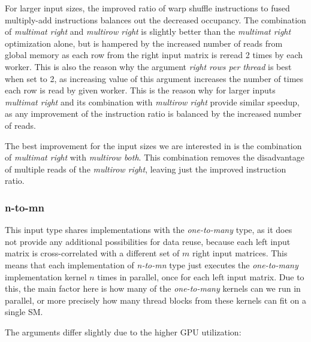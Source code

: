 For larger input sizes, the improved ratio of warp shuffle instructions to fused multiply-add instructions balances out the decreased occupancy. The combination of \textit{multimat right} and \textit{multirow right} is slightly better than the \textit{multimat right} optimization alone, but is hampered by the increased number of reads from global memory as each row from the right input matrix is reread 2 times by each worker. This is also the reason why the argument \textit{right rows per thread} is best when set to 2, as increasing value of this argument increases the number of times each row is read by given worker. This is the reason why for larger inputs \textit{multimat right} and its combination with \textit{multirow right} provide similar speedup, as any improvement of the instruction ratio is balanced by the increased number of reads.

The best improvement for the input sizes we are interested in is the combination of \textit{multimat right} with \textit{multirow both}. This combination removes the disadvantage of multiple reads of the \textit{multirow right}, leaving just the improved instruction ratio.


\subsubsection{n-to-mn}
This input type shares implementations with the \textit{one-to-many} type, as it does not provide any additional possibilities for data reuse, because each left input matrix is cross-correlated with a different set of $m$ right input matrices. This means that each implementation of \textit{n-to-mn} type just executes the \textit{one-to-many} implementation kernel $n$ times in parallel, once for each left input matrix. Due to this, the main factor here is how many of the \textit{one-to-many} kernels can we run in parallel, or more precisely how many thread blocks from these kernels can fit on a single SM.

The arguments differ slightly due to the higher GPU utilization:

